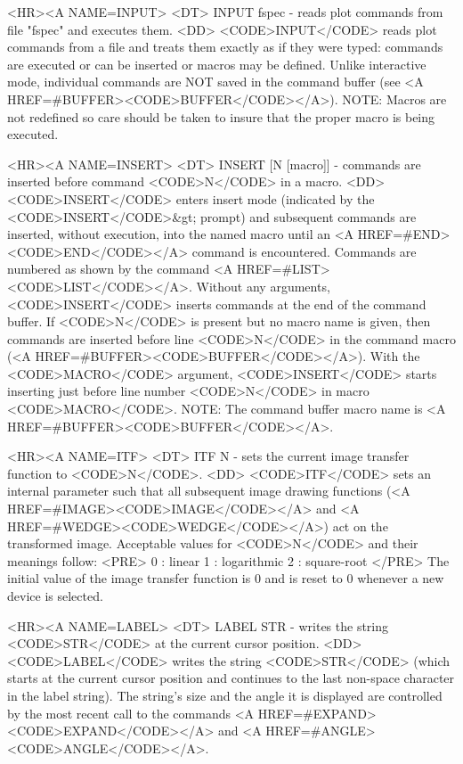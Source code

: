 \begin{rawhtml}
<HR><A NAME=INPUT>
<DT>
INPUT fspec - reads plot commands from file "fspec" and executes them.
<DD>
	<CODE>INPUT</CODE> reads plot commands from a file and treats
	them exactly as if they were typed:  commands are executed or
	can be inserted or macros may be defined.  Unlike interactive
	mode, individual commands are NOT saved in the command buffer
	(see <A HREF=#BUFFER><CODE>BUFFER</CODE></A>).
	NOTE: Macros are not redefined so care should be taken to
	insure that the proper macro is being executed.

<HR><A NAME=INSERT>
<DT>
INSERT [N [macro]] - commands are inserted before command <CODE>N</CODE> in a macro.
<DD>
	<CODE>INSERT</CODE> enters insert mode (indicated by the
	<CODE>INSERT</CODE>&gt; prompt) and
	subsequent commands are inserted, without execution, into the
	named macro until an <A HREF=#END><CODE>END</CODE></A> command
	is encountered.  Commands are numbered as shown by the command
	<A HREF=#LIST><CODE>LIST</CODE></A>.  Without any arguments,
	<CODE>INSERT</CODE> inserts commands at the end of the command
	buffer.  If <CODE>N</CODE> is present but no macro name is given,
	then commands are inserted before line <CODE>N</CODE> in the
	command macro (<A HREF=#BUFFER><CODE>BUFFER</CODE></A>).  With
	the <CODE>MACRO</CODE> argument, <CODE>INSERT</CODE> starts
	inserting just before line number <CODE>N</CODE> in macro
	<CODE>MACRO</CODE>.
	NOTE: The command buffer macro name is
	<A HREF=#BUFFER><CODE>BUFFER</CODE></A>.

<HR><A NAME=ITF>
<DT>
ITF N - sets the current image transfer function to <CODE>N</CODE>.
<DD>
	<CODE>ITF</CODE> sets an internal parameter such that all subsequent
	image drawing functions (<A HREF=#IMAGE><CODE>IMAGE</CODE></A> and
	<A HREF=#WEDGE><CODE>WEDGE</CODE></A>) act on the transformed image.
	Acceptable values for <CODE>N</CODE> and their meanings follow:
	<PRE>
    0 : linear
    1 : logarithmic
    2 : square-root
	</PRE>
	The initial value of the image transfer function is 0 and is
	reset to 0 whenever a new device is selected.

<HR><A NAME=LABEL>
<DT>
LABEL STR - writes the string <CODE>STR</CODE> at the current cursor position.
<DD>
	<CODE>LABEL</CODE> writes the string <CODE>STR</CODE> (which
	starts at the current cursor position and continues to the
	last non-space character in the label string).  The string's 
	size and the angle it is displayed are controlled by the most
	recent call to the commands <A HREF=#EXPAND><CODE>EXPAND</CODE></A>
	and <A HREF=#ANGLE><CODE>ANGLE</CODE></A>.


\end{rawhtml}
